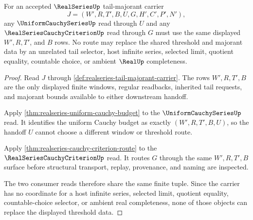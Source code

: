 \begin{theorem}
\label{thm:realseries-uniform-cauchy-threshold-coherence}
For an accepted $\RealSeriesUp$ tail-majorant carrier
$$
J=(W',R,T',B,U,G,H',C',P',N'),
$$
any $\UniformCauchySeriesUp$ read through $U$ and any $\RealSeriesCauchyCriterionUp$ read through $G$ must use the same displayed $W',R,T'$, and $B$ rows. No route may replace the shared threshold and majorant data by an unrelated tail selector, host infinite series, selected limit, quotient equality, countable choice, or ambient $\RealUp$ completeness.
\end{theorem}
\begin{proof}
Read $J$ through \autoref{def:realseries-tail-majorant-carrier}. The rows $W',R,T',B$ are the only displayed finite windows, regular readbacks, inherited tail requests, and majorant bounds available to either downstream handoff.

Apply \autoref{thm:realseries-uniform-cauchy-budget} to the $\UniformCauchySeriesUp$ read. It identifies the uniform Cauchy budget as exactly $(W',R,T',B,U)$, so the handoff $U$ cannot choose a different window or threshold route.

Apply \autoref{thm:realseries-cauchy-criterion-route} to the $\RealSeriesCauchyCriterionUp$ read. It routes $G$ through the same $W',R,T',B$ surface before structural transport, replay, provenance, and naming are inspected.

The two consumer reads therefore share the same finite tuple. Since the carrier has no coordinate for a host infinite series, selected limit, quotient equality, countable-choice selector, or ambient real completeness, none of those objects can replace the displayed threshold data.
\end{proof}

